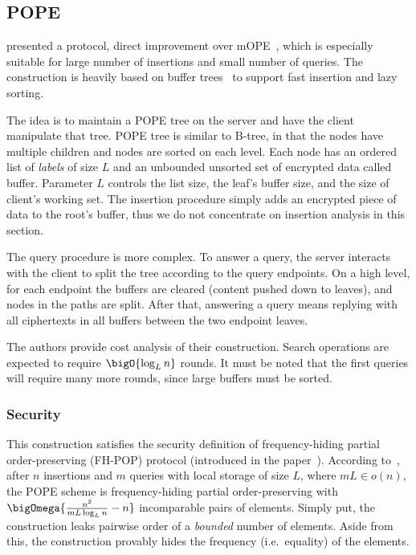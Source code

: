 \subsection{POPE}

	\textcite{pope} presented a protocol, direct improvement over mOPE~\cite{ope-ideal-security-protocol}, which is especially suitable for large number of insertions and small number of queries.
	The construction is heavily based on buffer trees~\cite{buffer-tree} to support fast insertion and lazy sorting.

	The idea is to maintain a POPE tree on the server and have the client manipulate that tree.
	POPE tree is similar to B-tree, in that the nodes have multiple children and nodes are sorted on each level.
	Each node has an ordered list of \emph{labels} of size $L$ and an unbounded unsorted set of encrypted data called buffer.
	Parameter $L$ controls the list size, the leaf's buffer size, and the size of client's working set.
	The insertion procedure simply adds an encrypted piece of data to the root's buffer, thus we do not concentrate on insertion analysis in this section.

	The query procedure is more complex.
	To answer a query, the server interacts with the client to split the tree according to the query endpoints.
	On a high level, for each endpoint the buffers are cleared (content pushed down to leaves), and nodes in the paths are split.
	After that, answering a query means replying with all ciphertexts in all buffers between the two endpoint leaves.

	The authors provide cost analysis of their construction.
	Search operations are expected to require $\bigO{\log_L n}$ rounds.
	It must be noted that the first queries will require many more rounds, since large buffers must be sorted.

	\subsubsection{Security}
		This construction satisfies the security definition of frequency\hyp{}hiding partial order-preserving (FH-POP) protocol (introduced in the paper~\cite{pope}).
		According to~\cite[Theorem~3]{pope}, after $n$ insertions and $m$ queries with local storage of size $L$, where $m L \in o(n)$, the POPE scheme is frequency-hiding partial order-preserving with $\bigOmega{ \frac{n^2}{mL \log_L n} - n }$ incomparable pairs of elements. %
		Simply put, the construction leaks pairwise order of a \emph{bounded} number of elements.
		Aside from this, the construction provably hides the frequency (i.e.\ equality) of the elements.

